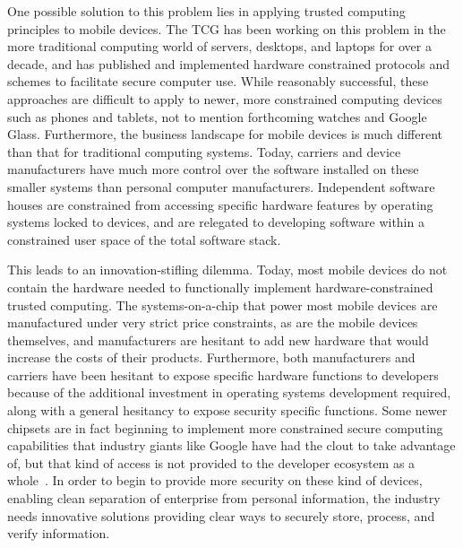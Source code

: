 \documentclass[10pt,letterpaper]{article}
\begin{document}
One possible solution to this problem lies in applying trusted computing principles to mobile devices. The TCG has been working on this problem in the more traditional computing world of servers, desktops, and laptops for over a decade, and has published and implemented hardware constrained protocols and schemes to facilitate secure computer use. While reasonably successful, these approaches are difficult to apply to newer, more constrained computing devices such as phones and tablets, not to mention forthcoming watches and Google Glass. Furthermore, the business landscape for mobile devices is much different than that for traditional computing systems. Today, carriers and device manufacturers have much more control over the software installed on these smaller systems than personal computer manufacturers. Independent software houses are constrained from accessing specific hardware features by operating systems locked to devices, and are relegated to developing software within a constrained user space of the total software stack.

This leads to an innovation-stifling dilemma. Today, most mobile devices do not contain the hardware needed to functionally implement hardware-constrained trusted computing. The systems-on-a-chip that power most mobile devices are manufactured under very strict price constraints, as are the mobile devices themselves, and manufacturers are hesitant to add new hardware that would increase the costs of their products. Furthermore, both manufacturers and carriers have been hesitant to expose specific hardware functions to developers because of the additional investment in operating systems development required, along with a general hesitancy to expose security specific functions. Some newer chipsets are in fact beginning to implement more constrained secure computing capabilities that industry giants like Google have had the clout to take advantage of, but that kind of access is not provided to the developer ecosystem as a whole~\cite{Vasudevan12}.  In order to begin to provide more security on these kind of devices, enabling clean separation of enterprise from personal information, the industry needs innovative solutions providing clear ways to securely store, process, and verify information.
\end{document}

